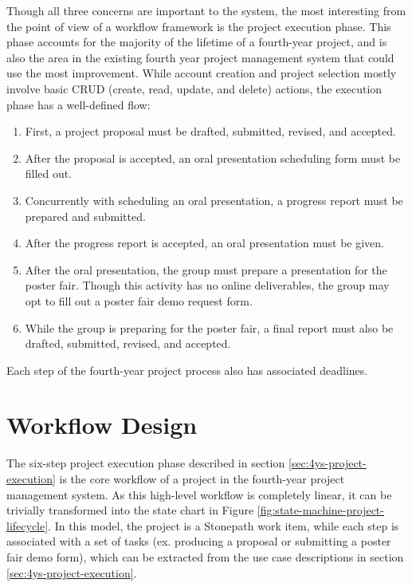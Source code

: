 \documentclass[document.tex]{subfiles}
\begin{document}
Though all three concerns are important to the system, the most interesting from the point of view of a workflow framework is the project execution phase. This phase accounts for the majority of the lifetime of a fourth-year project, and is also the area in the existing fourth year project management system that could use the most improvement. While account creation and project selection mostly involve basic CRUD (create, read, update, and delete) actions, the execution phase has a well-defined flow:
\begin{enumerate}
\item First, a project proposal must be drafted, submitted, revised, and accepted.
\item After the proposal is accepted, an oral presentation scheduling form must be filled out.
\item Concurrently with scheduling an oral presentation, a progress report must be prepared and submitted.
\item After the progress report is accepted, an oral presentation must be given.
\item After the oral presentation, the group must prepare a presentation for the poster fair. Though this activity has no online deliverables, the group may opt to fill out a poster fair demo request form.
\item While the group is preparing for the poster fair, a final report must also be drafted, submitted, revised, and accepted.
\end{enumerate}
Each step of the fourth-year project process also has associated deadlines.

\FloatBarrier


\section{Workflow Design}
\label{sec:4ys-workflow-design}

The six-step project execution phase described in section \ref{sec:4ys-project-execution} is the core workflow of a project in the fourth-year project management system. As this high-level workflow is completely linear, it can be trivially transformed into the state chart in Figure \ref{fig:state-machine-project-lifecycle}. In this model, the project is a Stonepath work item, while each step is associated with a set of tasks (ex. producing a proposal or submitting a poster fair demo form), which can be extracted from the use case descriptions in section \ref{sec:4ys-project-execution}.
\end{document}
